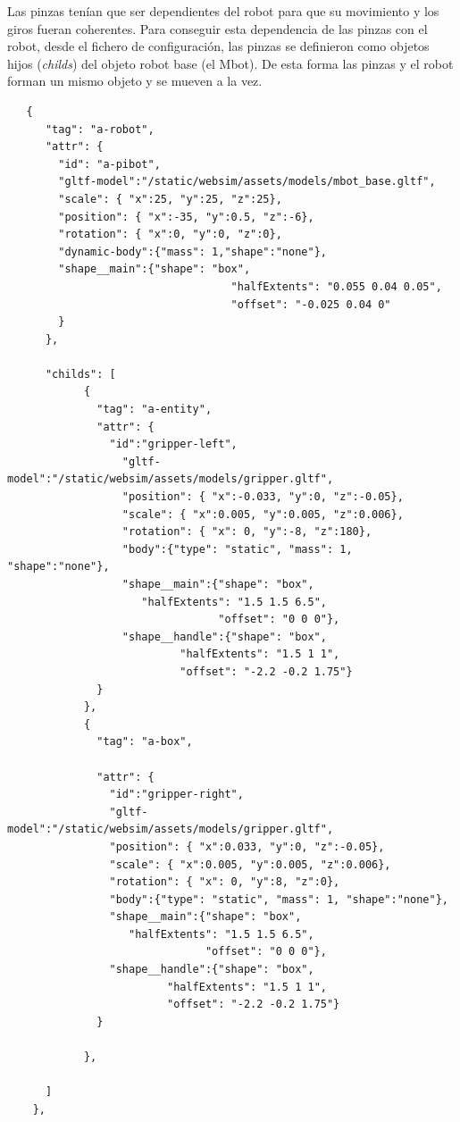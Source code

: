 Las pinzas tenían que ser dependientes del robot para que su movimiento y los giros fueran coherentes. 
Para conseguir esta dependencia de las pinzas con el robot, desde el fichero de configuración, las pinzas se definieron como objetos hijos (\textit{childs}) del objeto robot base (el Mbot). De esta forma las pinzas y el robot forman un mismo objeto y se mueven a la vez.

\begin{lstlisting}
   {
      "tag": "a-robot",
      "attr": {
        "id": "a-pibot",
        "gltf-model":"/static/websim/assets/models/mbot_base.gltf",
        "scale": { "x":25, "y":25, "z":25},
        "position": { "x":-35, "y":0.5, "z":-6},
        "rotation": { "x":0, "y":0, "z":0},
        "dynamic-body":{"mass": 1,"shape":"none"},
        "shape__main":{"shape": "box",
                                   "halfExtents": "0.055 0.04 0.05",
                                   "offset": "-0.025 0.04 0"
        }
      },
      
      "childs": [
            {
              "tag": "a-entity",
              "attr": {
                "id":"gripper-left",
		          "gltf-model":"/static/websim/assets/models/gripper.gltf",
                  "position": { "x":-0.033, "y":0, "z":-0.05},
                  "scale": { "x":0.005, "y":0.005, "z":0.006},
                  "rotation": { "x": 0, "y":-8, "z":180},
                  "body":{"type": "static", "mass": 1, "shape":"none"},
                  "shape__main":{"shape": "box",
                     "halfExtents": "1.5 1.5 6.5",
                                 "offset": "0 0 0"},
                  "shape__handle":{"shape": "box",
                           "halfExtents": "1.5 1 1",
                           "offset": "-2.2 -0.2 1.75"}
              }
            },
            {
              "tag": "a-box",

              "attr": {
                "id":"gripper-right",
		        "gltf-model":"/static/websim/assets/models/gripper.gltf",
                "position": { "x":0.033, "y":0, "z":-0.05},
                "scale": { "x":0.005, "y":0.005, "z":0.006},
                "rotation": { "x": 0, "y":8, "z":0},
                "body":{"type": "static", "mass": 1, "shape":"none"},
                "shape__main":{"shape": "box",
			       "halfExtents": "1.5 1.5 6.5",
                               "offset": "0 0 0"},
		        "shape__handle":{"shape": "box",
                         "halfExtents": "1.5 1 1",
                         "offset": "-2.2 -0.2 1.75"}
              }
              
            },
         
      ]
    },
    
\end{lstlisting}

